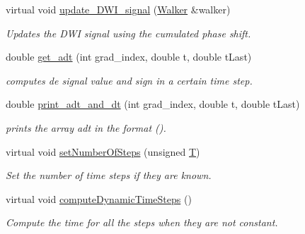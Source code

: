 \begin{DoxyCompactItemize}
virtual void \hyperlink{class_p_g_s_e_sequence_ae2b79f12ccd2f2446a498cb51f45e88d}{update\+\_\+\+D\+W\+I\+\_\+signal} (\hyperlink{class_walker}{Walker} \&walker)
\begin{DoxyCompactList}\small\item\em Updates the D\+WI signal using the cumulated phase shift. \end{DoxyCompactList}\item 
\mbox{\label{class_p_g_s_e_sequence_a885a0415519683a7fbfa1883f7f3d807}} 
double \hyperlink{class_p_g_s_e_sequence_a885a0415519683a7fbfa1883f7f3d807}{get\+\_\+adt} (int grad\+\_\+index, double t, double t\+Last)
\begin{DoxyCompactList}\small\item\em computes de signal value and sign in a certain time step. \end{DoxyCompactList}\item 
\mbox{\label{class_p_g_s_e_sequence_afa9e363ef76474d5e2495407034a10d4}} 
double \hyperlink{class_p_g_s_e_sequence_afa9e363ef76474d5e2495407034a10d4}{print\+\_\+adt\+\_\+and\+\_\+dt} (int grad\+\_\+index, double t, double t\+Last)
\begin{DoxyCompactList}\small\item\em prints the array adt in the format (). \end{DoxyCompactList}\item 
\mbox{\label{class_p_g_s_e_sequence_a89f9bf116876b04403058a240a91efa3}} 
virtual void \hyperlink{class_p_g_s_e_sequence_a89f9bf116876b04403058a240a91efa3}{set\+Number\+Of\+Steps} (unsigned \hyperlink{class_p_g_s_e_sequence_a07e27e6e8a8506521386a291d62e8423}{T})
\begin{DoxyCompactList}\small\item\em Set the number of time steps if they are known. \end{DoxyCompactList}\item 
\mbox{\label{class_p_g_s_e_sequence_ac115d93aabb283f19568f55493d57ded}} 
virtual void \hyperlink{class_p_g_s_e_sequence_ac115d93aabb283f19568f55493d57ded}{compute\+Dynamic\+Time\+Steps} ()
\begin{DoxyCompactList}\small\item\em Compute the time for all the steps when they are not constant. \end{DoxyCompactList}\end{DoxyCompactItemize}
